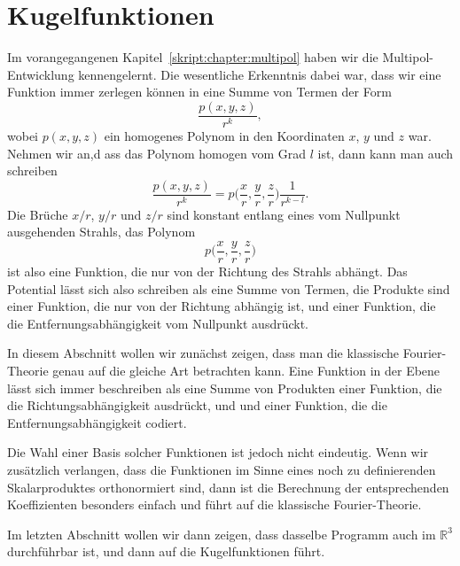 %
%
%
\chapter{Kugelfunktionen%
\label{skript:chapter:kugelfunktionen}}
\rhead{}
Im vorangegangenen Kapitel~\ref{skript:chapter:multipol} haben wir
die Multipol-Entwicklung kennengelernt. 
Die wesentliche Erkenntnis dabei war, dass wir eine Funktion immer zerlegen
können in eine Summe von Termen der Form
\[
\frac{p(x,y,z)}{r^k},
\]
wobei $p(x,y,z)$ ein homogenes Polynom in den Koordinaten $x$, $y$ und
$z$ war.
Nehmen wir an,d ass das Polynom homogen vom Grad $l$ ist, dann kann man
auch schreiben
\[
\frac{p(x,y,z)}{r^k}
=
p\biggl(\frac{x}{r},\frac{y}{r},\frac{z}{r}\biggr)\frac1{r^{k-l}}.
\]
Die Brüche $x/r$, $y/r$ und $z/r$ sind konstant entlang eines vom
Nullpunkt ausgehenden Strahls, das Polynom 
\[
p\biggl(\frac{x}{r},\frac{y}{r},\frac{z}{r}\biggr)
\]
ist also eine Funktion, die nur von der Richtung des Strahls
abhängt.
Das Potential lässt sich also schreiben als eine Summe von Termen,
die Produkte sind einer Funktion, die nur von der Richtung abhängig
ist, und einer Funktion, die die Entfernungsabhängigkeit vom Nullpunkt
ausdrückt.

In diesem Abschnitt wollen wir zunächst zeigen, dass man die klassische
Fourier-Theorie genau auf die gleiche Art betrachten kann.
Eine Funktion in der Ebene lässt sich immer beschreiben als eine Summe
von Produkten einer Funktion, die die Richtungsabhängigkeit ausdrückt, und
und einer Funktion, die die Entfernungsabhängigkeit codiert.

Die Wahl einer Basis solcher Funktionen ist jedoch nicht eindeutig.
Wenn wir zusätzlich verlangen, dass die Funktionen im Sinne eines noch
zu definierenden Skalarproduktes orthonormiert sind, dann ist die
Berechnung der entsprechenden Koeffizienten besonders einfach und
führt auf die klassische Fourier-Theorie.

Im letzten Abschnitt wollen wir dann zeigen, dass dasselbe Programm
auch im $\mathbb R^3$ durchführbar ist, und dann auf die Kugelfunktionen
führt.

